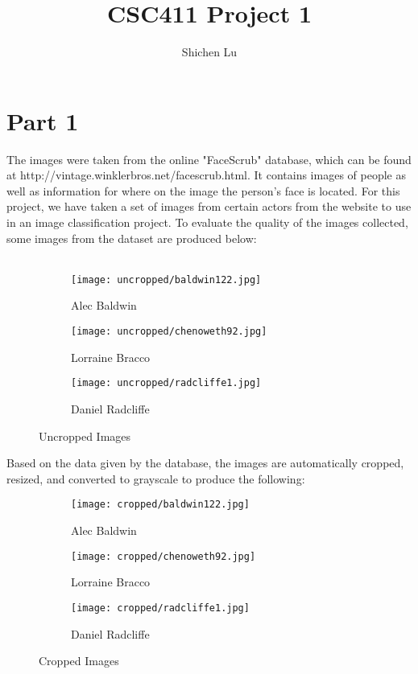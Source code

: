 \documentclass[11pt,a4paper]{report}
\author{Shichen Lu}
\title{CSC411 Project 1}
\begin{document}
\maketitle

\section*{Part 1}
The images were taken from the online "FaceScrub" database, which can be found at http://vintage.winklerbros.net/facescrub.html. It contains images of people as well as information for where on the image the person's face is located. For this project, we have taken a set of images from certain actors from the website to use in an image classification project. To evaluate the quality of the images collected, some images from the dataset are produced below:\\\\


\begin{figure}[h]
\centering
\begin{subfigure}{.3\textwidth}
  \centering
  \texttt{[image: uncropped/baldwin122.jpg]}
  \caption{Alec Baldwin}
  \label{fig:sub1}
\end{subfigure}%
\begin{subfigure}{.3\textwidth}
  \centering
  \texttt{[image: uncropped/chenoweth92.jpg]}
  \caption{Lorraine Bracco}
  \label{fig:sub2}
\end{subfigure}
\begin{subfigure}{.3\textwidth}
  \centering
  \texttt{[image: uncropped/radcliffe1.jpg]}
  \caption{Daniel Radcliffe}
  \label{fig:sub2}
\end{subfigure}
\caption{Uncropped Images}
\label{fig:test}
\end{figure}	

Based on the data given by the database, the images are automatically cropped, resized, and converted to grayscale to produce the following:

\begin{figure}[h]
\centering
\begin{subfigure}{.3\textwidth}
  \centering
  \texttt{[image: cropped/baldwin122.jpg]}
  \caption{Alec Baldwin}
  \label{fig:sub1}
\end{subfigure}%
\begin{subfigure}{.3\textwidth}
  \centering
  \texttt{[image: cropped/chenoweth92.jpg]}
  \caption{Lorraine Bracco}
  \label{fig:sub2}
\end{subfigure}
\begin{subfigure}{.3\textwidth}
  \centering
  \texttt{[image: cropped/radcliffe1.jpg]}
  \caption{Daniel Radcliffe}
  \label{fig:sub2}
\end{subfigure}
\caption{Cropped Images}
\label{fig:test}
\end{figure}	
\end{document}
